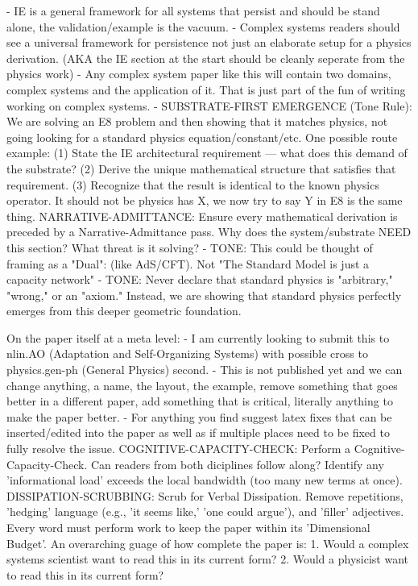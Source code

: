 - IE is a general framework for all systems that persist and should be stand alone, the validation/example is the vacuum.
- Complex systems readers should see a universal framework for persistence not just an elaborate setup for a physics derivation.  (AKA the IE section at the start should be cleanly seperate from the physics work)
- Any complex system paper like this will contain two domains, complex systems and the application of it.  That is just part of the fun of writing working on complex systems.
- SUBSTRATE-FIRST EMERGENCE (Tone Rule): We are solving an E8 problem and then showing that it matches physics, not going looking for a  standard physics equation/constant/etc.  One possible route example: (1) State the IE architectural requirement — what does this demand of the substrate? (2) Derive the unique mathematical structure that satisfies that requirement. (3) Recognize that the result is identical to the known physics operator. It should not be physics has X, we now try to say Y in E8 is the same thing. 
NARRATIVE-ADMITTANCE: Ensure every mathematical derivation is preceded by a Narrative-Admittance pass. Why does the system/substrate NEED this section? What threat is it solving?
- TONE: This could be thought of framing as a "Dual": (like AdS/CFT). Not "The Standard Model is just a capacity network" 
- TONE: Never declare that standard physics is "arbitrary," "wrong," or an "axiom." Instead, we are showing that standard physics perfectly emerges from this deeper geometric foundation.

On the paper itself at a meta level:
- I am currently looking to submit this to nlin.AO (Adaptation and Self-Organizing Systems) with possible cross to physics.gen-ph (General Physics) second. 
- This is not published yet and we can change anything, a name, the layout, the example, remove something that goes better in a different paper, add something that is critical, literally anything to make the paper better.
- For anything you find suggest latex fixes that can be inserted/edited into the paper as well as if multiple places need to be fixed to fully resolve the issue.
COGNITIVE-CAPACITY-CHECK: Perform a Cognitive-Capacity-Check. Can readers from both diciplines follow along? Identify any 'informational load' exceeds the local bandwidth (too many new terms at once).
DISSIPATION-SCRUBBING: Scrub for Verbal Dissipation. Remove repetitions, 'hedging' language (e.g., 'it seems like,' 'one could argue'), and 'filler' adjectives. Every word must perform work to keep the paper within its 'Dimensional Budget'.
An overarching guage of how complete the paper is: 1. Would a complex systems scientist want to read this in its current form? 2. Would a physicist want to read this in its current form? 


